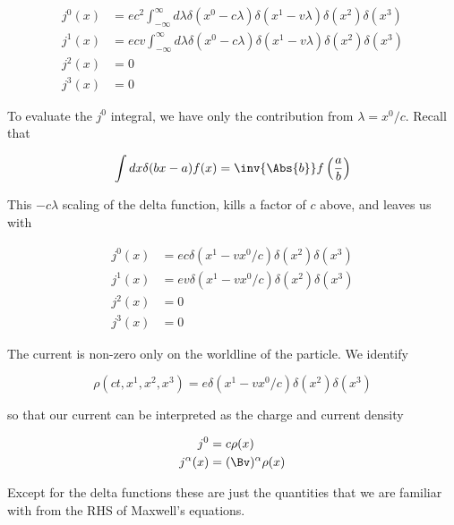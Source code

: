 \begin{equation}\label{eqn:relativisticElectrodynamicsL12b:490}
\begin{aligned}
j^0(x) &= e c^2  \int_{-\infty}^\infty d\lambda \delta(x^0 -  c \lambda) \delta(x^1 -  v \lambda) \delta(x^2) \delta(x^3) \\
j^1(x) &= e c v  \int_{-\infty}^\infty d\lambda \delta(x^0 -  c \lambda) \delta(x^1 -  v \lambda) \delta(x^2) \delta(x^3) \\
j^2(x) &= 0 \\
j^3(x) &= 0
\end{aligned}
\end{equation}

To evaluate the \(j^0\) integral, we have only the contribution from \(\lambda = x^0/ c\).  Recall that 

\begin{equation}\label{eqn:relativisticElectrodynamicsL12b:510}
\int dx \delta( b x - a) f(x) = \inv{\Abs{b}} f\left( \frac{a}{b} \right)
\end{equation}

This \(- c\lambda\) scaling of the delta function, kills a factor of \(c \) above, and leaves us with

\begin{equation}\label{eqn:relativisticElectrodynamicsL12b:530}
\begin{aligned}
j^0(x) &= e c \delta(x^1 - v x^0/c) \delta(x^2) \delta(x^3) \\
j^1(x) &= e v \delta(x^1 - v x^0/c) \delta(x^2) \delta(x^3) \\
j^2(x) &= 0 \\
j^3(x) &= 0 
\end{aligned}
\end{equation}

The current is non-zero only on the worldline of the particle.  We identify

\begin{equation}\label{eqn:relativisticElectrodynamicsL12b:550}
\rho(ct, x^1, x^2, x^3) = e \delta(x^1 - v x^0/c) \delta(x^2) \delta(x^3) 
\end{equation}

so that our current can be interpreted as the charge and current density 

\begin{equation}\label{eqn:relativisticElectrodynamicsL12b:570}
\begin{aligned}
j^0 &= c \rho(x) \\
j^\alpha(x) &= (\Bv)^\alpha \rho(x)
\end{aligned}
\end{equation}

Except for the delta functions these are just the quantities that we are familiar with from the RHS of Maxwell's equations.
